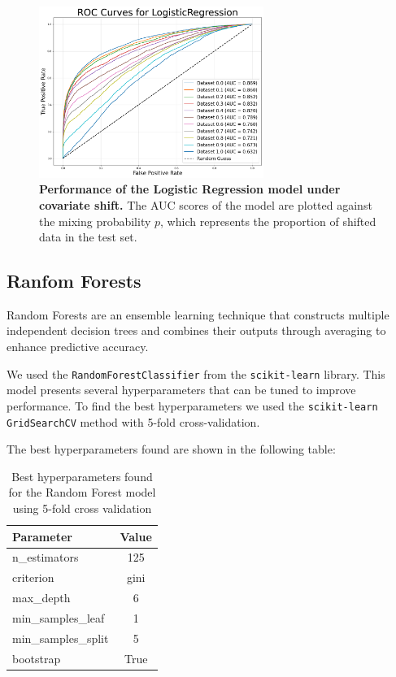 \begin{figure}[H]
	\centering
	\includegraphics[width=0.65\textwidth]{assets/lr_auc.png}
	\caption{\textbf{Performance of the Logistic Regression model under covariate shift.} \newline The AUC scores of the model are plotted against the mixing probability $p$, which represents the proportion of shifted data in the test set.}
	\label{fig:logistic-regression-perf}
\end{figure}

\subsection{Ranfom Forests}

Random Forests are an ensemble learning technique that constructs multiple independent decision trees and combines their outputs through averaging to enhance predictive accuracy.

We used the \texttt{RandomForestClassifier} from the \texttt{scikit-learn} library. This model presents several hyperparameters that can be tuned to improve performance. To find the best hyperparameters we used the \texttt{scikit-learn} \texttt{GridSearchCV} method with 5-fold cross-validation.

The best hyperparameters found are shown in the following table:

\vspace{0.3em}

\begin{table}[H]
    \centering
    \begin{tabular}{l|c}
    \toprule
    \textbf{Parameter} & \textbf{Value} \\
    \midrule
    n\_estimators & 125 \\
    criterion & gini \\
    max\_depth & 6 \\
    min\_samples\_leaf & 1 \\
    min\_samples\_split & 5 \\
    bootstrap & True \\
    \bottomrule
    \end{tabular}
    \label{tab:rf_hyperparameters}
    \caption{Best hyperparameters found for the Random Forest model using 5-fold cross validation}
\end{table}

